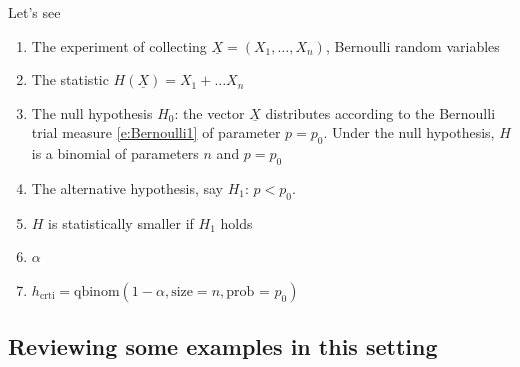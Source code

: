 	Let's see 
	\begin{enumerate}
		\item  The experiment of collecting $\underline X = (X_1, \ldots, X_n) $, Bernoulli random variables
		\item The statistic $H(\underline X) = X_1 + \ldots X_n$
		\item The null hypothesis $H_0$: the vector $\underline X$ distributes according to the Bernoulli trial measure \eqref{e:Bernoulli1} of parameter $p = p_0$. Under the null hypothesis, $H$ is a binomial of parameters $n$ and $p = p_0$
		\item The  alternative hypothesis, say  $H_1$: $p <  p_0$. 
		\item $H$ is statistically smaller if $H_1$ holds
		\item $\alpha$
		\item $h_{\text{crti}} = \text{qbinom}( 1- \alpha ,\text{size} = n , \text{prob = }p_0 )$ 
	\end{enumerate}
	
	\subsection{Reviewing some examples in this setting}

